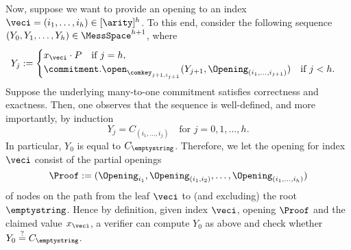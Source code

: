	Now, suppose we want to provide an opening to an index $\veci = (i_1,\ldots,i_h) \in [\arity]^h$. To this end, consider the following sequence $(Y_0,Y_1,\ldots,Y_{h}) \in \MessSpace^{h+1}$, where
	\[ Y_j := \begin{cases} x_\veci \cdot P \quad \text{if } j = h, \\
		 \commitment.\open_{\comkey_{j+1,i_{j+1}}}(Y_{j+1}, \Opening_{(i_1,\ldots,i_{j+1})}) \quad \text{if } j < h.
	\end{cases}\]
	Suppose the underlying many-to-one commitment satisfies correctness and exactness. Then, one observes that the sequence is well-defined, and more importantly, by induction 
	\[ Y_j  = C_{(i_1,\ldots,i_{j})} \quad \text{for } j=0,1,\ldots,h.\]
	In particular, $Y_0$ is equal to $C_\emptystring$. Therefore, we let the opening for index $\veci$ consist of the partial openings 
	\[\Proof := (\Opening_{i_1}, \Opening_{(i_1,i_2)},\ldots,\Opening_{(i_1,\ldots,i_h)})\]
	of nodes on the path from the leaf $\veci$ to (and excluding) the root $\emptystring$. Hence by definition, given index $\veci$, opening $\Proof$ and the claimed value $x_\veci$, a verifier can compute $Y_0$ as above and check whether $Y_0 \stackrel{?}{=} C_\emptystring$.
	
